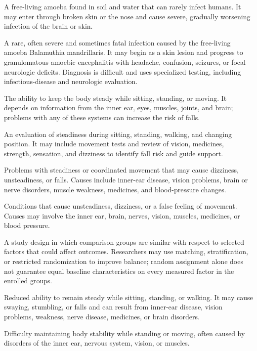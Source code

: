  A free-living amoeba found in soil and water that can rarely infect humans. It may enter through broken skin or the nose and cause severe, gradually worsening infection of the brain or skin.

 A rare, often severe and sometimes fatal infection caused by the free-living amoeba Balamuthia mandrillaris. It may
begin as a skin lesion and progress to granulomatous amoebic encephalitis with headache, confusion, seizures, or
focal neurologic deficits. Diagnosis is difficult and uses specialized testing, including infectious-disease and
neurologic evaluation.

 The ability to keep the body steady while sitting, standing, or moving. It depends on information from the inner ear, eyes, muscles, joints, and brain; problems with any of these systems can increase the risk of falls.

 An evaluation of steadiness during sitting, standing, walking, and changing position. It may include movement tests and review of vision, medicines, strength, sensation, and dizziness to identify fall risk and guide support.

 Problems with steadiness or coordinated movement that may cause dizziness, unsteadiness, or falls. Causes include inner-ear disease, vision problems, brain or nerve disorders, muscle weakness, medicines, and blood-pressure changes.

 Conditions that cause unsteadiness, dizziness, or a false feeling of movement. Causes may involve the inner ear, brain, nerves, vision, muscles, medicines, or blood pressure.

 A study design in which comparison groups are similar
with respect to selected factors that could affect outcomes. Researchers may
use matching, stratification, or restricted randomization to improve balance;
random assignment alone does not guarantee equal baseline characteristics
on every measured factor in the enrolled groups.

 Reduced ability to remain steady while sitting, standing, or walking. It may cause swaying, stumbling, or falls and can result from inner-ear disease, vision problems, weakness, nerve disease, medicines, or brain disorders.

 Difficulty maintaining body stability while standing or moving, often caused by disorders of the inner ear, nervous system, vision, or muscles.

